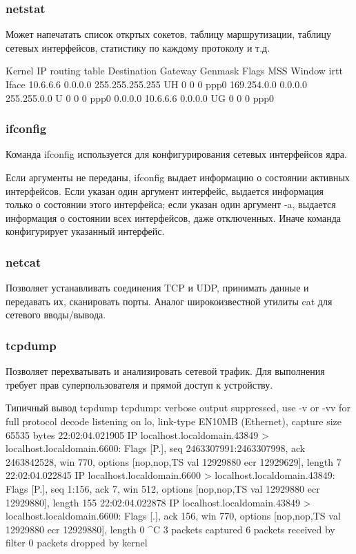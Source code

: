 \subsubsection{netstat}
Может напечатать список откртых сокетов, таблицу маршрутизации, таблицу сетевых интерфейсов, статистику по каждому протоколу и т.д.
\begin{plainlst}{}{}
Kernel IP routing table
Destination   Gateway    Genmask         Flags   MSS Window  irtt Iface
10.6.6.6      0.0.0.0    255.255.255.255 UH        0 0          0 ppp0
169.254.0.0   0.0.0.0    255.255.0.0     U         0 0          0 ppp0
0.0.0.0       10.6.6.6   0.0.0.0         UG        0 0          0 ppp0
\end{plainlst}

\subsubsection{ifconfig}
Команда ifconfig используется для конфигурирования сетевых интерфейсов ядра.

Если аргументы не переданы, ifconfig выдает информацию о состоянии активных интерфейсов. Если указан один аргумент интерфейс, выдается информация только о состоянии этого интерфейса; если указан один аргумент -a, выдается информация о состоянии всех интерфейсов, даже отключенных. Иначе команда конфигурирует указанный интерфейс.

\subsubsection{netcat}
Позволяет устанавливать соединения TCP и UDP, принимать данные и передавать их, сканировать порты. Аналог широкоизвестной утилиты cat для сетевого вводы/вывода.

\subsubsection{tcpdump}
Позволяет перехватывать и анализировать сетевой трафик. Для выполнения требует прав суперпользователя и прямой доступ к устройству.

\begin{plainlst}{Типичный вывод tcpdump}{}
tcpdump: verbose output suppressed, use -v or -vv for full protocol decode
listening on lo, link-type EN10MB (Ethernet), capture size 65535 bytes
22:02:04.021905 IP localhost.localdomain.43849 > localhost.localdomain.6600: Flags [P.], seq 2463307991:2463307998, ack 2463842528, win 770, options [nop,nop,TS val 12929880 ecr 12929629], length 7
22:02:04.022845 IP localhost.localdomain.6600 > localhost.localdomain.43849: Flags [P.], seq 1:156, ack 7, win 512, options [nop,nop,TS val 12929880 ecr 12929880], length 155
22:02:04.022878 IP localhost.localdomain.43849 > localhost.localdomain.6600: Flags [.], ack 156, win 770, options [nop,nop,TS val 12929880 ecr 12929880], length 0
^C
3 packets captured
6 packets received by filter
0 packets dropped by kernel
\end{plainlst}

